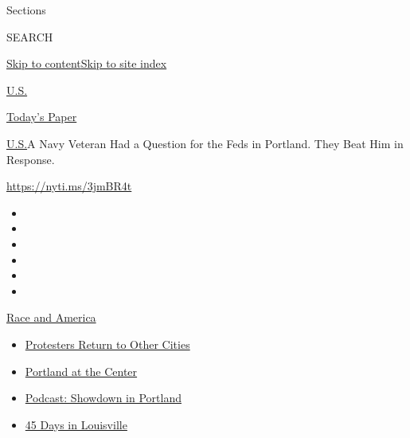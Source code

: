 Sections

SEARCH

\protect\hyperlink{site-content}{Skip to
content}\protect\hyperlink{site-index}{Skip to site index}

\href{https://www.nytimes3xbfgragh.onion/section/us}{U.S.}

\href{https://myaccount.nytimes3xbfgragh.onion/auth/login?response_type=cookie\&client_id=vi}{}

\href{https://www.nytimes3xbfgragh.onion/section/todayspaper}{Today's
Paper}

\href{/section/us}{U.S.}\textbar{}A Navy Veteran Had a Question for the
Feds in Portland. They Beat Him in Response.

\url{https://nyti.ms/3jmBR4t}

\begin{itemize}
\item
\item
\item
\item
\item
\item
\end{itemize}

\href{https://www.nytimes3xbfgragh.onion/news-event/george-floyd-protests-minneapolis-new-york-los-angeles?action=click\&pgtype=Article\&state=default\&region=TOP_BANNER\&context=storylines_menu}{Race
and America}

\begin{itemize}
\tightlist
\item
  \href{https://www.nytimes3xbfgragh.onion/2020/07/26/us/protests-portland-seattle-trump.html?action=click\&pgtype=Article\&state=default\&region=TOP_BANNER\&context=storylines_menu}{Protesters
  Return to Other Cities}
\item
  \href{https://www.nytimes3xbfgragh.onion/2020/07/24/us/portland-oregon-protests-white-race.html?action=click\&pgtype=Article\&state=default\&region=TOP_BANNER\&context=storylines_menu}{Portland
  at the Center}
\item
  \href{https://www.nytimes3xbfgragh.onion/2020/07/23/podcasts/the-daily/portland-protests.html?action=click\&pgtype=Article\&state=default\&region=TOP_BANNER\&context=storylines_menu}{Podcast:
  Showdown in Portland}
\item
  \href{https://www.nytimes3xbfgragh.onion/interactive/2020/07/16/us/black-lives-matter-protests-louisville-breonna-taylor.html?action=click\&pgtype=Article\&state=default\&region=TOP_BANNER\&context=storylines_menu}{45
  Days in Louisville}
\end{itemize}

